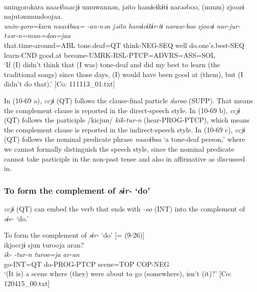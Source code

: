   \ex\relax [= (8-141 b)]\\
      \glll    unin{\textbar}goro{\textbar}kara  naacɨbaacjɨ  umuwannən,  jəito  hamɨcɨkɨtɨ narəəboo,  (mmm)  zjoozɨ  najutənmundoojaa.\\
      \textit{unin-goro=kara}  \textit{naacɨbaa=}  \textit{-an-nən  jəito  hamɨcɨkɨr-tɨ}   \textit{naraw-boo}    \textit{zjoozɨ}  \textit{nar-jur-təər-n=mun=doo=jaa}\\
      that.time-around=ABL  tone.deaf=QT  think-NEG-SEQ  well  do.one’s.best-SEQ  learn-CND    good.at  become-UMRK-RSL-PTCP=ADVRS=ASS=SOL\\
      \glt       ‘If (I) didn’t think that (I was) tone-deaf and did my best to learn (the traditional songs) since those days, (I) would have been good at (them), but (I didn’t do that).’ [Co: 111113\_01.txt]
    \z
\z

In (10-69 a), \textit{ccjɨ} (QT) follows the clause-final particle \textit{daroo} (SUPP). That means the complement clause is reported in the direct-speech style. In (10-69 b), \textit{ccjɨ} (QT) follows the participle /kicjun/ \textit{kik-tur-n} (hear-PROG-PTCP), which means the complement clause is reported in the indirect-speech style. In (10-69 c), \textit{ccjɨ} (QT) follows the nominal predicate phrase \textit{naacɨbaa} ‘a tone-deaf person,’ where we cannot formally distinguish the speech style, since the nominal predicate cannot take participle in the non-past tense and also in affirmative as discussed in.

\subsubsection{To form the complement of \textit{sɨr-} ‘do’}\label{sec:10.4.1.3}

\textit{ccjɨ} (QT) can embed the verb that ends with \textit{{}-oo} (INT) into the complement of \textit{sɨr-} ‘do.’

\ea\label{ex:10.70}   To form the complement of \textit{sɨr-} ‘do’ [= (9-26)]\\
      \glll    ikjoccjɨ  sjun  turooja  aran?\\
    \textit{ik-}  \textit{-tur-n  turoo=ja  ar-an}\\
    go-INT=QT  do-PROG-PTCP  scene=TOP  COP-NEG\\
\glt     ‘(It is) a scene where (they) were about to go (somewhere), isn’t (it)?’  [Co: 120415\_00.txt]
\z

